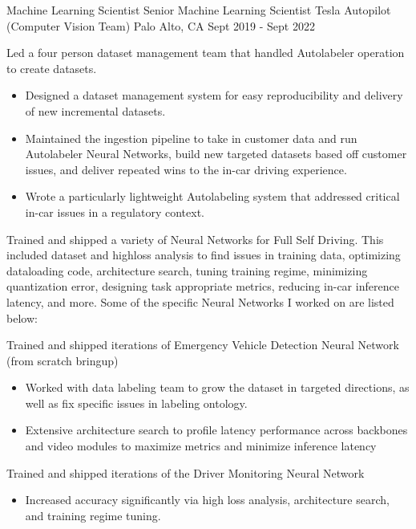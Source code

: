 \begin{cventries}
  \cventry
  {Machine Learning Scientist \rightarrow \; Senior Machine Learning Scientist}
  {Tesla Autopilot (Computer Vision Team)}
  {Palo Alto, CA}
  {Sept 2019 - Sept 2022}
  {
    \begin{cvitems}
      \item Led a four person dataset management team that handled Autolabeler operation to create datasets.
      \begin{itemize}
        \item Designed a dataset management system for easy reproducibility and delivery of new incremental datasets.
        \item Maintained the ingestion pipeline to take in customer data and run Autolabeler Neural Networks,
              build new targeted datasets based off customer issues, and deliver repeated wins to the in-car driving experience.
        \item Wrote a particularly lightweight Autolabeling system that addressed critical in-car issues in a regulatory context.
      \end{itemize}
      \item Trained and shipped a variety of Neural Networks for Full Self Driving. This included dataset and highloss analysis
      to find issues in training data, optimizing dataloading code, architecture search, tuning training regime,
      minimizing quantization error, designing task appropriate metrics, reducing in-car inference latency, and more.
      Some of the specific Neural Networks I worked on are listed below:
      \item Trained and shipped iterations of Emergency Vehicle Detection Neural Network (from scratch bringup)
      \begin{itemize}
        \item Worked with data labeling team to grow the dataset in targeted directions, as well as fix specific
              issues in labeling ontology.
        \item Extensive architecture search to profile latency performance across backbones and video modules to
              maximize metrics and minimize inference latency
      \end{itemize}
      \item Trained and shipped iterations of the Driver Monitoring Neural Network
      \begin{itemize}
        \item Increased accuracy significantly via high loss analysis, architecture search, and training regime tuning.

\end{itemize}
\end{cvitems}}
\end{cventries}
